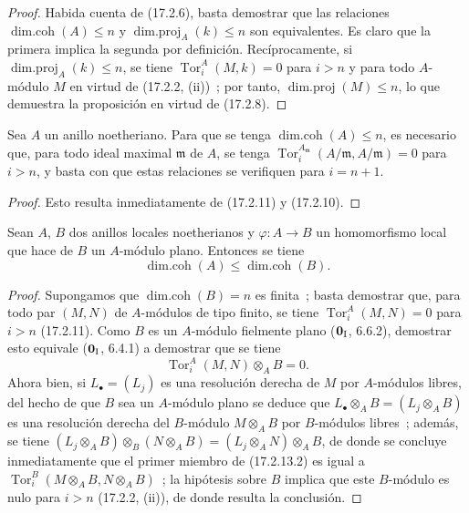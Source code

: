 \begin{proof}
Habida cuenta de (17.2.6), basta demostrar que las relaciones
$\operatorname{dim.coh}(A)\leq n$ y
$\operatorname{dim.proj}_A(k)\leq n$ son equivalentes. Es claro que la
primera implica la segunda por definición. Recíprocamente, si
$\operatorname{dim.proj}_A(k)\leq n$, se tiene
$\operatorname{Tor}^A_i(M,k)=0$ para $i>n$ y para todo $A$-módulo $M$ en
virtud de (17.2.2, (ii))~; por tanto, $\operatorname{dim.proj}(M)\leq n$, lo que
demuestra la proposición en virtud de (17.2.8).
\end{proof}

\begin{corollary}[17.2.12]
\label{0.17.2.12-fr}
Sea $A$ un anillo noetheriano. Para que se tenga
$\operatorname{dim.coh}(A)\leq n$, es necesario que, para todo ideal
maximal $\mathfrak{m}$ de $A$, se tenga
$\operatorname{Tor}^{A_{\mathfrak{m}}}_i(A/\mathfrak{m},A/\mathfrak{m})=0$
para $i>n$, y basta con que estas relaciones se verifiquen para $i=n+1$.
\end{corollary}

\begin{proof}
Esto resulta inmediatamente de (17.2.11) y (17.2.10).
\end{proof}

\begin{proposition}[17.2.13]
\label{0.17.2.13-fr}
Sean $A$, $B$ dos anillos locales noetherianos y
$\varphi:A\longrightarrow B$ un homomorfismo local que hace de $B$ un
$A$-módulo plano. Entonces se tiene
\begin{equation}
\label{0.17.2.13.1-fr}
\tag{17.2.13.1}
  \operatorname{dim.coh}(A)\leq\operatorname{dim.coh}(B).
\end{equation}
\end{proposition}

\begin{proof}
Supongamos que $\operatorname{dim.coh}(B)=n$ es finita~; basta demostrar
que, para todo par $(M,N)$ de $A$-módulos de tipo finito, se tiene
$\operatorname{Tor}^A_i(M,N)=0$ para $i>n$ (17.2.11). Como $B$ es un
$A$-módulo fielmente plano ($\mathbf{0}_{\rm I}$, 6.6.2), demostrar esto equivale
($\mathbf{0}_{\rm I}$, 6.4.1) a demostrar que se tiene
\begin{equation}
\label{0.17.2.13.2-fr}
\tag{17.2.13.2}
  \operatorname{Tor}^A_i(M,N)\otimes_A B=0.
\end{equation}
Ahora bien, si $L_\bullet=(L_j)$ es una resolución derecha de $M$ por $A$-módulos
libres, del hecho de que $B$ sea un $A$-módulo plano se deduce que
$L_\bullet\otimes_A B=(L_j\otimes_A B)$ es una resolución derecha del
$B$-módulo $M\otimes_A B$ por $B$-módulos libres~; además, se tiene
$(L_j\otimes_A B)\otimes_B(N\otimes_A B)
=(L_j\otimes_A N)\otimes_A B$, de donde se concluye inmediatamente que el primer miembro
de (17.2.13.2) es igual a
$\operatorname{Tor}^B_i(M\otimes_A B,N\otimes_A B)$~; la hipótesis sobre $B$
implica que este $B$-módulo es nulo para $i>n$ (17.2.2, (ii)), de donde resulta la
conclusión.
\end{proof}

